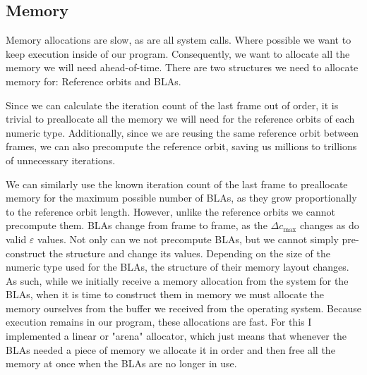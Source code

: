 \documentclass{article}
\begin{document}
\subsection{Memory}
\par Memory allocations are slow, as are all system calls. Where possible we want to keep execution inside of our program. Consequently, we want to allocate all the memory we will need ahead-of-time. There are two structures we need to allocate memory for: Reference orbits and BLAs.
\par Since we can calculate the iteration count of the last frame out of order, it is trivial to preallocate all the memory we will need for the reference orbits of each numeric type. Additionally, since we are reusing the same reference orbit between frames, we can also precompute the reference orbit, saving us millions to trillions of unnecessary iterations.
\par We can similarly use the known iteration count of the last frame to preallocate memory for the maximum possible number of BLAs, as they grow proportionally to the reference orbit length. However, unlike the reference orbits we cannot precompute them. BLAs change from frame to frame, as the $\Delta c_{\textrm{max}}$ changes as do valid $\varepsilon$ values. Not only can we not precompute BLAs, but we cannot simply pre-construct the structure and change its values. Depending on the size of the numeric type used for the BLAs, the structure of their memory layout changes. As such, while we initially receive a memory allocation from the system for the BLAs, when it is time to construct them in memory we must allocate the memory ourselves from the buffer we received from the operating system. Because execution remains in our program, these allocations are fast. For this I implemented a linear or "arena" allocator, which just means that whenever the BLAs needed a piece of memory we allocate it in order and then free all the memory at once when the BLAs are no longer in use.  
\end{document}
